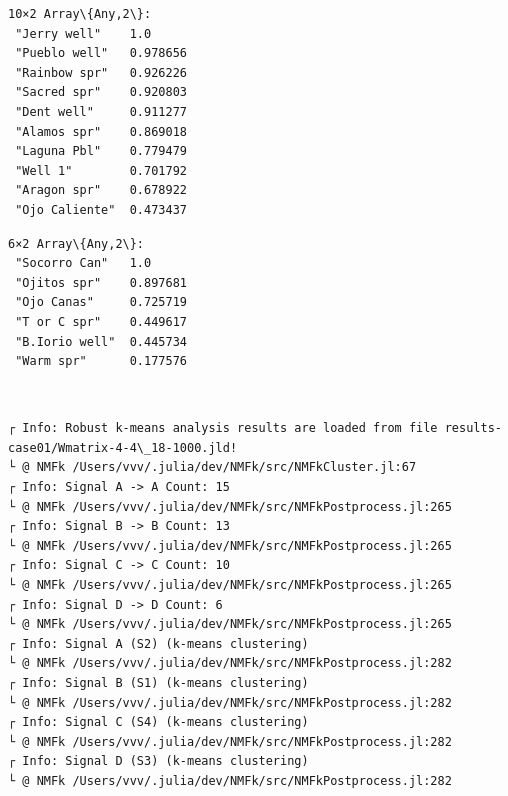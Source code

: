 \documentclass[11pt]{article}
\begin{document}
    
    
    \begin{Verbatim}[commandchars=\\\{\}]
10×2 Array\{Any,2\}:
 "Jerry well"    1.0
 "Pueblo well"   0.978656
 "Rainbow spr"   0.926226
 "Sacred spr"    0.920803
 "Dent well"     0.911277
 "Alamos spr"    0.869018
 "Laguna Pbl"    0.779479
 "Well 1"        0.701792
 "Aragon spr"    0.678922
 "Ojo Caliente"  0.473437
    \end{Verbatim}

    
    
    \begin{Verbatim}[commandchars=\\\{\}]
6×2 Array\{Any,2\}:
 "Socorro Can"   1.0
 "Ojitos spr"    0.897681
 "Ojo Canas"     0.725719
 "T or C spr"    0.449617
 "B.Iorio well"  0.445734
 "Warm spr"      0.177576
    \end{Verbatim}

    
    \begin{center}
    \end{center}
    { \hspace*{\fill} \\}
    
    \begin{Verbatim}[commandchars=\\\{\}]
┌ Info: Robust k-means analysis results are loaded from file results-
case01/Wmatrix-4-4\_18-1000.jld!
└ @ NMFk /Users/vvv/.julia/dev/NMFk/src/NMFkCluster.jl:67
┌ Info: Signal A -> A Count: 15
└ @ NMFk /Users/vvv/.julia/dev/NMFk/src/NMFkPostprocess.jl:265
┌ Info: Signal B -> B Count: 13
└ @ NMFk /Users/vvv/.julia/dev/NMFk/src/NMFkPostprocess.jl:265
┌ Info: Signal C -> C Count: 10
└ @ NMFk /Users/vvv/.julia/dev/NMFk/src/NMFkPostprocess.jl:265
┌ Info: Signal D -> D Count: 6
└ @ NMFk /Users/vvv/.julia/dev/NMFk/src/NMFkPostprocess.jl:265
┌ Info: Signal A (S2) (k-means clustering)
└ @ NMFk /Users/vvv/.julia/dev/NMFk/src/NMFkPostprocess.jl:282
┌ Info: Signal B (S1) (k-means clustering)
└ @ NMFk /Users/vvv/.julia/dev/NMFk/src/NMFkPostprocess.jl:282
┌ Info: Signal C (S4) (k-means clustering)
└ @ NMFk /Users/vvv/.julia/dev/NMFk/src/NMFkPostprocess.jl:282
┌ Info: Signal D (S3) (k-means clustering)
└ @ NMFk /Users/vvv/.julia/dev/NMFk/src/NMFkPostprocess.jl:282
    \end{Verbatim}

    \begin{center}
    \end{center}
    { \hspace*{\fill} \\}
    
\end{document}
